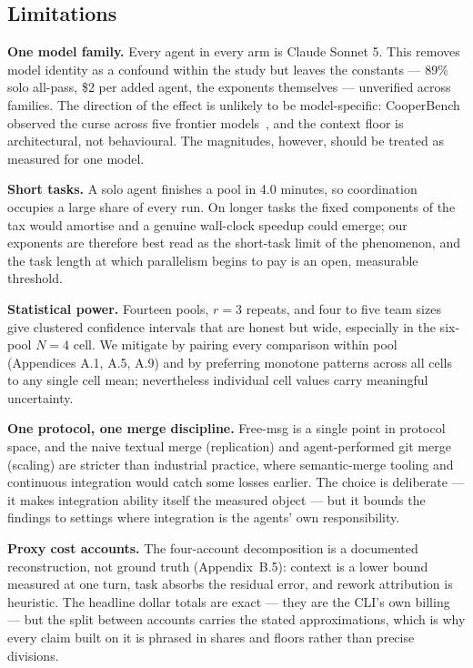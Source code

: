 \documentclass[11pt,a4paper]{article}
\begin{document}
\subsection{Limitations}\label{sec:limitations}

\textbf{One model family.} Every agent in every arm is Claude Sonnet 5. This removes model identity as a confound within the study but leaves the constants --- 89\% solo all-pass, \$2 per added agent, the exponents themselves --- unverified across families. The direction of the effect is unlikely to be model-specific: CooperBench observed the curse across five frontier models~\cite{khatua2026cooperbench}, and the context floor is architectural, not behavioural. The magnitudes, however, should be treated as measured for one model.

\textbf{Short tasks.} A solo agent finishes a pool in 4.0 minutes, so coordination occupies a large share of every run. On longer tasks the fixed components of the tax would amortise and a genuine wall-clock speedup could emerge; our exponents are therefore best read as the short-task limit of the phenomenon, and the task length at which parallelism begins to pay is an open, measurable threshold.

\textbf{Statistical power.} Fourteen pools, $r = 3$ repeats, and four to five team sizes give clustered confidence intervals that are honest but wide, especially in the six-pool $N = 4$ cell. We mitigate by pairing every comparison within pool (Appendices A.1, A.5, A.9) and by preferring monotone patterns across all cells to any single cell mean; nevertheless individual cell values carry meaningful uncertainty.

\textbf{One protocol, one merge discipline.} Free-msg is a single point in protocol space, and the naive textual merge (replication) and agent-performed git merge (scaling) are stricter than industrial practice, where semantic-merge tooling and continuous integration would catch some losses earlier. The choice is deliberate --- it makes integration ability itself the measured object --- but it bounds the findings to settings where integration is the agents' own responsibility.

\textbf{Proxy cost accounts.} The four-account decomposition is a documented reconstruction, not ground truth (Appendix~B.5): context is a lower bound measured at one turn, task absorbs the residual error, and rework attribution is heuristic. The headline dollar totals are exact --- they are the CLI's own billing --- but the split between accounts carries the stated approximations, which is why every claim built on it is phrased in shares and floors rather than precise divisions.
\end{document}
